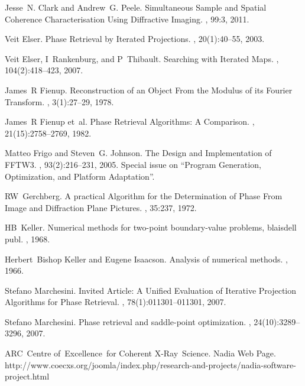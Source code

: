 \documentclass[]{nadia}
\begin{document}
\begin{thebibliography}{50}
Jesse~N. Clark and Andrew~G. Peele.
\newblock Simultaneous Sample and Spatial Coherence Characterisation Using
  Diffractive Imaging.
, 99:3, 2011.

Veit Elser.
\newblock Phase Retrieval by Iterated Projections.
, 20(1):40--55, 2003.

Veit Elser, I~Rankenburg, and P~Thibault.
\newblock Searching with Iterated Maps.
,
104(2):418--423, 2007.

James~R Fienup.
\newblock Reconstruction of an Object From the Modulus of its Fourier
  Transform.
, 3(1):27--29, 1978.

James~R Fienup et~al.
\newblock Phase Retrieval Algorithms: A Comparison.
, 21(15):2758--2769, 1982.

Matteo Frigo and Steven~G. Johnson.
\newblock The Design and Implementation of {FFTW3}.
, 93(2):216--231, 2005.
\newblock Special issue on ``Program Generation, Optimization, and Platform
  Adaptation''.

RW~Gerchberg.
\newblock A practical Algorithm for the Determination of Phase From Image and
  Diffraction Plane Pictures.
, 35:237, 1972.

HB~Keller.
\newblock Numerical methods for two-point boundary-value problems, blaisdell
  publ.
, 1968.

Herbert~Bishop Keller and Eugene Isaacson.
\newblock Analysis of numerical methods.
, 1966.

Stefano Marchesini.
\newblock Invited Article: A Unified Evaluation of Iterative Projection
  Algorithms for Phase Retrieval.
, 78(1):011301--011301, 2007.

Stefano Marchesini.
\newblock Phase retrieval and saddle-point optimization.
, 24(10):3289--3296, 2007.

ARC~Centre of~Excellence~for Coherent X-Ray~Science.
\newblock Nadia Web Page.
\newblock http://www.coecxs.org/joomla/index.php/research-and-projects/nadia-software-project.html



\end{thebibliography}
\end{document}

